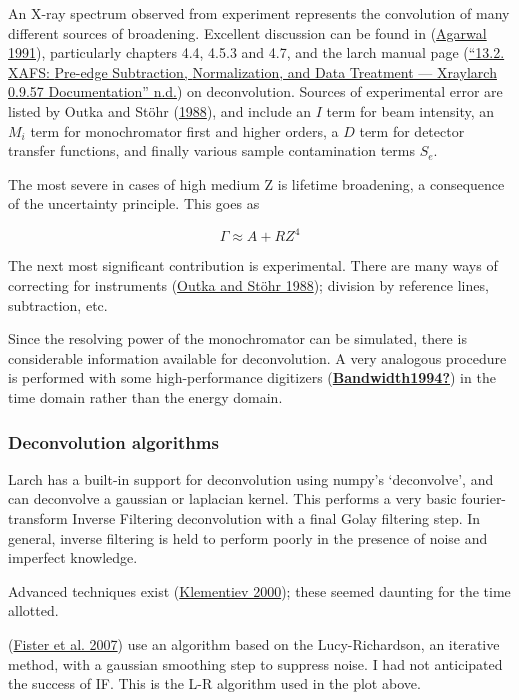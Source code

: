 \documentclass[
]{article}
\begin{document}
An X-ray spectrum observed from experiment represents the convolution of
many different sources of broadening. Excellent discussion can be found
in (\protect\hyperlink{ref-XRay1991}{Agarwal 1991}), particularly
chapters 4.4, 4.5.3 and 4.7, and the larch manual page
(\protect\hyperlink{ref-13a}{{``13.2. {XAFS}: {Pre-edge Subtraction},
{Normalization}, and Data Treatment --- Xraylarch 0.9.57
Documentation''} n.d.}) on deconvolution. Sources of experimental error
are listed by Outka and Stöhr (\protect\hyperlink{ref-Curve1988}{1988}),
and include an \(I\) term for beam intensity, an \(M_i\) term for
monochromator first and higher orders, a \(D\) term for detector
transfer functions, and finally various sample contamination terms
\(S_e\).

The most severe in cases of high medium Z is lifetime broadening, a
consequence of the uncertainty principle. This goes as

\[\Gamma\approx A + RZ^4\]

The next most significant contribution is experimental. There are many
ways of correcting for instruments
(\protect\hyperlink{ref-Curve1988}{Outka and Stöhr 1988}); division by
reference lines, subtraction, etc.

Since the resolving power of the monochromator can be simulated, there
is considerable information available for deconvolution. A very
analogous procedure is performed with some high-performance digitizers
(\protect\hyperlink{ref-Bandwidth1994}{\textbf{Bandwidth1994?}}) in the
time domain rather than the energy domain.

\hypertarget{deconvolution-algorithms}{%
\subsubsection{Deconvolution
algorithms}\label{deconvolution-algorithms}}

Larch has a built-in support for deconvolution using numpy's
`deconvolve', and can deconvolve a gaussian or laplacian kernel. This
performs a very basic fourier-transform Inverse Filtering deconvolution
with a final Golay filtering step. In general, inverse filtering is held
to perform poorly in the presence of noise and imperfect knowledge.

Advanced techniques exist
(\protect\hyperlink{ref-Extraction2000}{Klementiev 2000}); these seemed
daunting for the time allotted.

(\protect\hyperlink{ref-Deconvolving2007}{Fister et al. 2007}) use an
algorithm based on the Lucy-Richardson, an iterative method, with a
gaussian smoothing step to suppress noise. I had not anticipated the
success of IF. This is the L-R algorithm used in the plot above.
\end{document}

